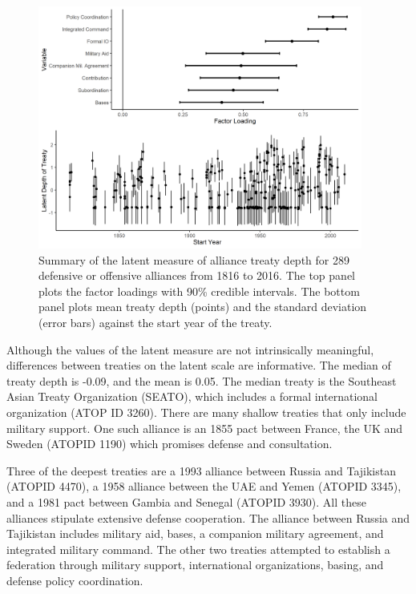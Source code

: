 \documentclass[12pt]{article}
\begin{document}
\begin{figure}
	\centering
		\includegraphics[width=0.95\textwidth]{../figures/ld-summary.png}
	\caption{Summary of the latent measure of alliance treaty depth for 289 defensive or offensive alliances from 1816 to 2016. The top panel plots the factor loadings with 90\% credible intervals. The bottom panel plots mean treaty depth (points) and the standard deviation (error bars) against the start year of the treaty.}
	\label{fig:ld-summary}
\end{figure}


Although the values of the latent measure are not intrinsically meaningful, differences between treaties on the latent scale are informative. 
The median of treaty depth is -0.09, and the mean is 0.05. 
The median treaty is the Southeast Asian Treaty Organization (SEATO), which includes a formal international organization (ATOP ID 3260). 
There are many shallow treaties that only include military support. 
One such alliance is an 1855 pact between France, the UK and Sweden (ATOPID 1190) which promises defense and consultation. 


Three of the deepest treaties are a 1993 alliance between Russia and Tajikistan (ATOPID 4470), a 1958 alliance between the UAE and Yemen (ATOPID 3345), and a 1981 pact between Gambia and Senegal (ATOPID 3930). 
All these alliances stipulate extensive defense cooperation. 
The alliance between Russia and Tajikistan includes military aid, bases, a companion military agreement, and integrated military command. 
The other two treaties attempted to establish a federation through military support, international organizations, basing, and defense policy coordination. 
\end{document}
